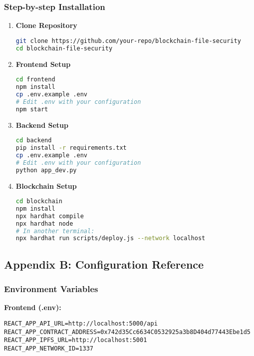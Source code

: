 \documentclass[11pt,a4paper]{article}
\begin{document}
\subsubsection{Step-by-step Installation}

\begin{enumerate}
    \item \textbf{Clone Repository}
    \begin{lstlisting}[language=bash]
git clone https://github.com/your-repo/blockchain-file-security
cd blockchain-file-security
    \end{lstlisting}

    \item \textbf{Frontend Setup}
    \begin{lstlisting}[language=bash]
cd frontend
npm install
cp .env.example .env
# Edit .env with your configuration
npm start
    \end{lstlisting}

    \item \textbf{Backend Setup}
    \begin{lstlisting}[language=bash]
cd backend
pip install -r requirements.txt
cp .env.example .env
# Edit .env with your configuration
python app_dev.py
    \end{lstlisting}

    \item \textbf{Blockchain Setup}
    \begin{lstlisting}[language=bash]
cd blockchain
npm install
npx hardhat compile
npx hardhat node
# In another terminal:
npx hardhat run scripts/deploy.js --network localhost
    \end{lstlisting}
\end{enumerate}

\subsection{Appendix B: Configuration Reference}

\subsubsection{Environment Variables}

\textbf{Frontend (.env):}
\begin{lstlisting}
REACT_APP_API_URL=http://localhost:5000/api
REACT_APP_CONTRACT_ADDRESS=0x742d35Cc6634C0532925a3b8D404d77443Ebe1d5
REACT_APP_IPFS_URL=http://localhost:5001
REACT_APP_NETWORK_ID=1337
\end{lstlisting}
\end{document}
